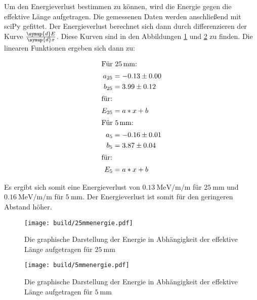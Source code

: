 Um den Energieverlust bestimmen zu können, wird die Energie gegen die effektive Länge aufgetragen.
Die gemessenen Daten werden anschließend mit sciPy gefittet.
Der Energieverlust berechnet sich dann durch differenzieren der Kurve $\frac{\symup{d}E}{\symup{d}x}$.
Diese Kurven sind in den Abbildungen \ref{fig:25mmenergie} und \ref{fig:5mmenergie} zu finden.
Die linearen Funktionen ergeben sich dann zu:

\begin{align*}
  \intertext{Für $\SI{25}{\milli\metre}$:}
  a_{25} &= -0.13 \pm 0.00 \\
  b_{25} &= 3.99  \pm 0.12 \\
  \shortintertext{für: } E_{25} &= a * x + b \\
  \intertext{Für $\SI{5}{\milli\metre}$:}
  a_{5} &= -0.16 \pm 0.01 \\
  b_{5} &= 3.87  \pm 0.04 \\
  \shortintertext{für: } E_{5} &= a * x + b \\
\end{align*}

Es ergibt sich somit eine Energieverlust von $\SI{0.13}{\mega\electronvolt\per\milli\per\metre}$ für $\SI{25}{\milli\metre}$ und $\SI{0.16}{\mega\electronvolt\per\milli\per\metre}$ für $\SI{5}{\milli\metre}$.
Der Energieverlust ist somit für den geringeren Abstand höher.

\begin{figure}
    \centering
    \texttt{[image: build/25mmenergie.pdf]}
    \caption{Die graphische Darstellung der Energie in Abhängigkeit der effektive Länge aufgetragen für $\SI{25}{\milli\metre}$}
    \label{fig:25mmenergie}
\end{figure}

\begin{figure}
    \centering
    \texttt{[image: build/5mmenergie.pdf]}
    \caption{$\SI{5}{\milli\metre}$}
    \label{fig:5mmenergie}
  \caption{Die graphische Darstellung der Energie in Abhängigkeit der effektive Länge aufgetragen für $\SI{5}{\milli\metre}$}
\end{figure}

